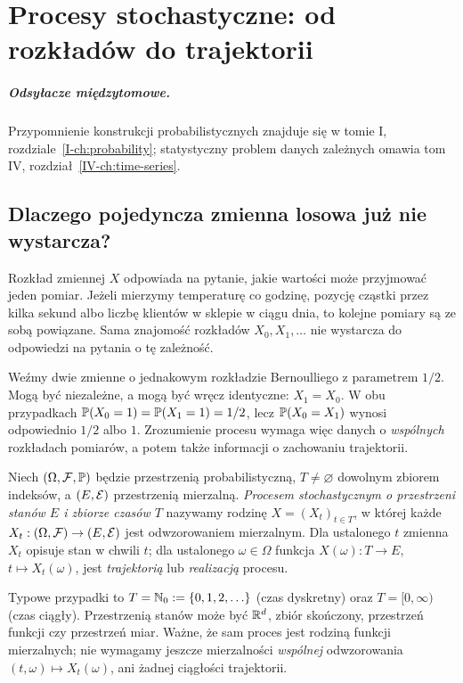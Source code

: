 \chapter{Procesy stochastyczne: od rozkładów do trajektorii}
\label{ch:procesy}
\paragraph{Odsyłacze międzytomowe.} Przypomnienie konstrukcji probabilistycznych znajduje się w tomie I, rozdziale~\ref{I-ch:probability}; statystyczny problem danych zależnych omawia tom IV, rozdział~\ref{IV-ch:time-series}.


\section{Dlaczego pojedyncza zmienna losowa już nie wystarcza?}
Rozkład zmiennej $X$ odpowiada na pytanie, jakie wartości może przyjmować
jeden pomiar. Jeżeli mierzymy temperaturę co godzinę, pozycję cząstki
przez kilka sekund albo liczbę klientów w sklepie w ciągu dnia, to
kolejne pomiary są ze sobą powiązane. Sama znajomość rozkładów
$X_0,X_1,\ldots$ nie wystarcza do odpowiedzi na pytania o tę zależność.

Weźmy dwie zmienne o jednakowym rozkładzie Bernoulliego z parametrem
$1/2$. Mogą być niezależne, a mogą być wręcz identyczne: $X_1=X_0$.
W obu przypadkach $\mathbb{P}(X_0=1)=\mathbb{P}(X_1=1)=1/2$, lecz
$\mathbb{P}(X_0=X_1)$ wynosi odpowiednio $1/2$ albo $1$.
Zrozumienie procesu wymaga więc danych o \emph{wspólnych} rozkładach
pomiarów, a potem także informacji o zachowaniu trajektorii.

\begin{definicja}
Niech $(\Omega,\mathcal{F},\mathbb{P})$ będzie przestrzenią probabilistyczną,
$T\ne\varnothing$ dowolnym zbiorem indeksów, a $(E,\mathcal{E})$
przestrzenią mierzalną. \emph{Procesem stochastycznym o przestrzeni
stanów $E$ i zbiorze czasów $T$} nazywamy rodzinę
$X=(X_t)_{t\in T}$, w której każde
$X_t:(\Omega,\mathcal{F})\to(E,\mathcal{E})$ jest odwzorowaniem mierzalnym.
Dla ustalonego $t$ zmienna $X_t$ opisuje stan w chwili $t$;
dla ustalonego $\omega\in\Omega$ funkcja
$X(\omega):T\to E$, $t\mapsto X_t(\omega)$, jest
\emph{trajektorią} lub \emph{realizacją} procesu.
\end{definicja}

Typowe przypadki to $T=\mathbb{N}_0:=\{0,1,2,\ldots\}$ (czas dyskretny)
oraz $T=[0,\infty)$ (czas ciągły). Przestrzenią stanów może być
$\mathbb{R}^d$, zbiór skończony, przestrzeń funkcji czy przestrzeń miar.
Ważne, że sam proces jest rodziną funkcji mierzalnych; nie
wymagamy jeszcze mierzalności \emph{wspólnej} odwzorowania
$(t,\omega)\mapsto X_t(\omega)$, ani żadnej ciągłości trajektorii.

